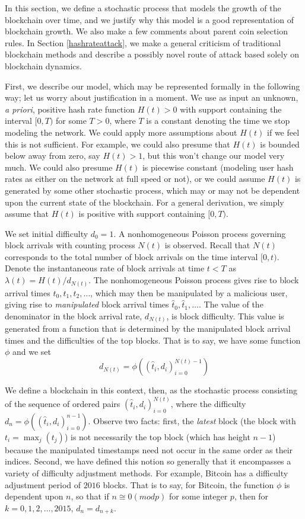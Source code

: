 \documentclass[12pt,english]{mrl}
\theoremstyle{definition}
\numberwithin{equation}{section}
\numberwithin{figure}{section}
\numberwithin{equation}{section}
\numberwithin{equation}{section}
\numberwithin{figure}{section}
\begin{document}
In this section, we define a stochastic process that models the growth of the blockchain over time, and we justify why this model is a good representation of blockchain growth. We also make a few comments about parent coin selection rules. In Section \ref{hashrateattack}, we make a general criticism of traditional blockchain methods and describe a possibly novel route of attack based solely on blockchain dynamics.

First, we describe our model, which may be represented formally in the following way; let us worry about justification in a moment. We use as input an unknown, \emph{a priori}, positive hash rate function $H(t) > 0$ with support containing the interval $[0,T)$ for some $T > 0$, where $T$ is a constant denoting the time we stop modeling the network. We could apply more assumptions about $H(t)$ if we feel this is not sufficient. For example, we could also presume that $H(t)$ is bounded below away from zero, say $H(t) > 1$, but this won't change our model very much. We could also presume $H(t)$ is piecewise constant (modeling user hash rates as either on the network at full speed or not), or we could assume $H(t)$ is generated by some other stochastic process, which may or may not be dependent upon the current state of the blockchain. For a general derivation, we simply assume that $H(t)$ is positive with support containing $[0,T)$.

We set initial difficulty $d_0 = 1$. A nonhomogeneous Poisson process governing block arrivals with counting process $N(t)$ is observed. Recall that $N(t)$ corresponds to the total number of block arrivals on the time interval $[0,t)$. Denote the instantaneous rate of block arrivals at time $t < T$ as $\lambda(t) = H(t)/d_{N(t)}$. The nonhomogeneous Poisson process gives rise to block arrival times $t_0, t_1, t_2, \ldots$, which may then be manipulated by a malicious user, giving rise to \emph{manipulated} block arrival times $\hat{t}_0, \hat{t}_1, \ldots$. The value of the denominator in the block arrival rate, $d_{N(t)}$, is block difficulty. This value is generated from a function that is determined by the manipulated block arrival times and the difficulties of the top blocks.  That is to say, we have some function $\phi$ and we set
\[d_{N(t)} = \phi((\hat{t}_i, d_i)_{i=0}^{N(t)-1})\]

We define a blockchain in this context, then, as the stochastic process consisting of the sequence of ordered pairs $(\hat{t}_i, d_i)_{i=0}^{N(t)}$, where the difficulty $d_n = \phi((\hat{t}_i, d_i)_{i=0}^{n-1})$. Observe two facts: first, the \emph{latest} block (the block with $t_i = \max_j (t_j)$) is not necessarily the top block (which has height $n-1$) because the manipulated timestamps need not occur in the same order as their indices. Second, we have defined this notion so generally that it encompasses a variety of difficulty adjustment methods. For example, Bitcoin has a difficulty adjustment period of $2016$ blocks. That is to say, for Bitcoin, the function $\phi$ is dependent upon $n$, so that if $n \cong 0 (mod p)$ for some integer $p$, then for $k=0, 1, 2, \ldots, 2015$, $d_n = d_{n+k}$.
\end{document}
